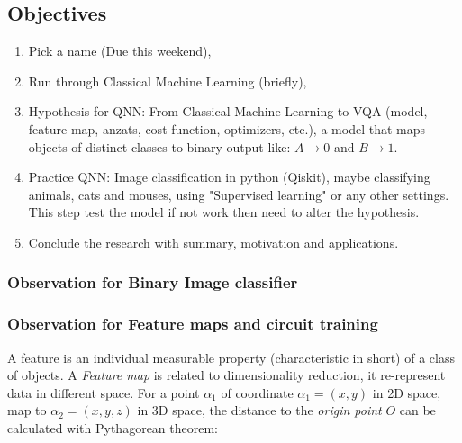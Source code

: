 \subsection{Objectives}
\begin{enumerate}
    \item Pick a name (Due this weekend),
    \item Run through Classical Machine Learning (briefly),
    \item Hypothesis for QNN: From Classical Machine Learning to VQA (model, feature map, anzats, cost function, optimizers, etc.), a model that maps objects of distinct classes to binary output like: $A \to 0$ and $B \to 1$.
    \item Practice QNN: Image classification in python (Qiskit), maybe classifying animals, cats and mouses, using "Supervised learning" or any other settings. This step test the model if not work then need to alter the hypothesis.
    \item Conclude the research with summary, motivation and applications.
\end{enumerate}
\subsubsection{Observation for Binary Image classifier}


\subsubsection{Observation for Feature maps and circuit training}
A feature is an individual measurable property (characteristic in short) of a class of objects. A \textit{Feature map} is related to dimensionality reduction, it re-represent data in different space.
For a point $\alpha_1$ of coordinate $\alpha_1 = (x, y)$ in 2D space, map to $\alpha_2 = (x, y, z)$ in 3D space, the distance to the \textit{origin point} $O$ can be calculated with Pythagorean theorem:

